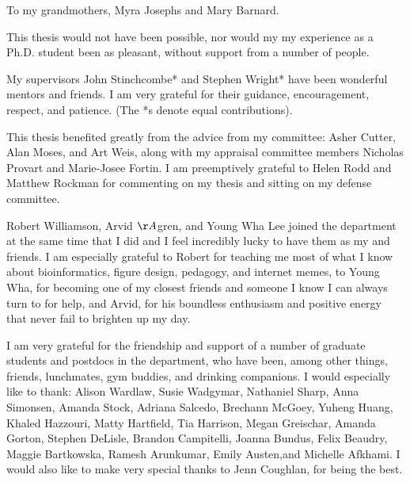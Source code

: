 \documentclass{ut-thesis}
\begin{document}
\begin{preliminary}
\begin{dedication}
To my grandmothers, Myra Josephs and Mary Barnard.
\end{dedication}

\newpage  %


\begin{acknowledgements}

This thesis would not have been possible, nor would my my experience as a Ph.D. student been as pleasant, without support from a number of people.

My supervisors John Stinchcombe* and Stephen Wright* have been wonderful mentors and friends. I am very grateful for their guidance, encouragement, respect, and patience. (The *s denote equal contributions).

This thesis benefited greatly from the advice from my committee: Asher Cutter, Alan Moses, and Art Weis, along with my appraisal committee members Nicholas Provart and Marie-Josee Fortin. I am preemptively grateful to Helen Rodd and Matthew Rockman for commenting on my thesis and sitting on my defense committee.

Robert Williamson, Arvid $\AA$gren, and Young Wha Lee joined the department at the same time that I did and I feel incredibly lucky to have them as my  and friends. I am especially grateful to Robert for teaching me most of what I know about bioinformatics, figure design, pedagogy, and internet memes, to Young Wha, for becoming one of my closest friends and someone I know I can always turn to for help, and Arvid, for his boundless enthusiasm and positive energy that never fail to brighten up my day.

I am very grateful for the friendship and support of a number of graduate students and postdocs in the department, who have been, among other things, friends, lunchmates, gym buddies, and drinking companions. I would especially like to thank: Alison Wardlaw, Susie Wadgymar, Nathaniel Sharp, Anna Simonsen, Amanda Stock, Adriana Salcedo, Brechann McGoey, Yuheng Huang, Khaled Hazzouri, Matty Hartfield, Tia Harrison, Megan Greischar, Amanda Gorton, Stephen DeLisle, Brandon Campitelli, Joanna Bundus, Felix Beaudry, Maggie Bartkowska, Ramesh Arunkumar, Emily Austen,and Michelle Afkhami. I would also like to make very special thanks to Jenn Coughlan, for being the best. 


\end{acknowledgements}
\end{preliminary}
\end{document}
